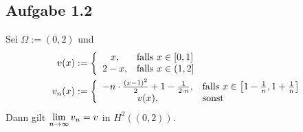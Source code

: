 \subsection{Aufgabe 1.2}
Sei $\Omega:=(0,2)$ und 
\begin{align*}
	v(x)&:=\left\lbrace\begin{array}{cl}
		x, & \text{falls } x\in[0,1]\\
		2-x, &\text{falls } x\in(1,2]
	\end{array}\right.\\
	v_n(x)&:=\left\lbrace\begin{array}{cl}
		-n\cdot\frac{(x-1)^2}{2}+1-\frac{1}{2\cdot n}, & \text{falls } x\in\left[1-\frac{1}{n},1+\frac{1}{n}\right]\\
		v(x),&\text{sonst }
	\end{array}\right.\\
\end{align*}
Dann gilt $\lim\limits_{n\to\infty} v_n=v$ in $H^2((0,2))$.

